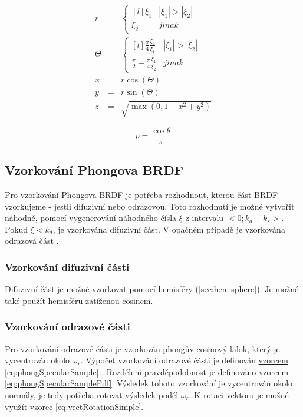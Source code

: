 \documentclass[czech,master,dept460,male,cpp,cpdeclaration]{diploma}
\newcommand{\randU}{\xi_{1}}
\newcommand{\randV}{\xi_{2}}
\newcommand{\refl}{\omega_{r}}
\begin{document}
\begin{eqnarray}
    r & = & \left\{\begin{matrix*}[l] \randU & |\randU| > \left | \randV \right |\\ \randV & jinak \end{matrix*}\right. \nonumber \\
    \Theta & = & \left\{\begin{matrix*}[l] \frac{\pi}{4}\frac{\randV}{\randU} & |\randU| > \left | \randV \right |\\ \frac{\pi}{2}-\frac{\pi}{4}\frac{\randU}{\randV} & jinak \end{matrix*}\right. \nonumber \\
    x & = &r\cos(\Theta)\nonumber \\
    y & = &r\sin(\Theta)\nonumber \\
    z & = &\sqrt{ \max(0, 1 - x^2 + y^2) }\label{eq:concentricHemisphere}
\end{eqnarray}

\begin{equation} \label{eq:concentricHemispherePdf}
    p = \frac{\cos\theta}{\pi}
\end{equation}

\subsection{Vzorkování Phongova BRDF} \label{sec:phongSampling}
Pro vzorkování Phongova BRDF je potřeba rozhodnout, kterou část BRDF vzorkujeme - jestli difuzivní nebo odrazovou. Toto rozhodnutí je možné vytvořit náhodně, pomocí vygenerování náhodného čísla $\xi$ z intervalu $<0;k_d+k_s>$. Pokud $\xi < k_d$, je vzorkována difuzivní část. V opačném případě je vzorkována odrazová část \cite{KrivanekBRDFIBL}.
\subsubsection{Vzorkování difuzivní části}
Difuzivní část je možné vzorkovat pomocí \hyperref[sec:hemisphere]{hemisféry (\ref{sec:hemisphere})}. Je možné také použít hemisféru zatíženou cosinem.

\subsubsection{Vzorkování odrazové části}
Pro vzorkování odrazové části je vzorkován phongův cosinový lalok, který je vycentrován okolo $\refl$. Výpočet vzorkování odrazové části je definován \hyperref[eq:phongSpecularSample]{vzorcem \ref{eq:phongSpecularSample}} \cite{KrivanekBRDFIBL}. Rozdělení pravděpodobnost je definováno \hyperref[eq:phongSpecularSamplePdf]{vzorcem \ref{eq:phongSpecularSamplePdf}}.
Výsledek tohoto vzorkování je vycentrován okolo normály, je tedy potřeba rotovat výsledek podél $\refl$. K rotaci vektoru je možné využít \hyperref[eq:vectRotationSimple]{vzorec \ref{eq:vectRotationSimple}}.
\end{document}
